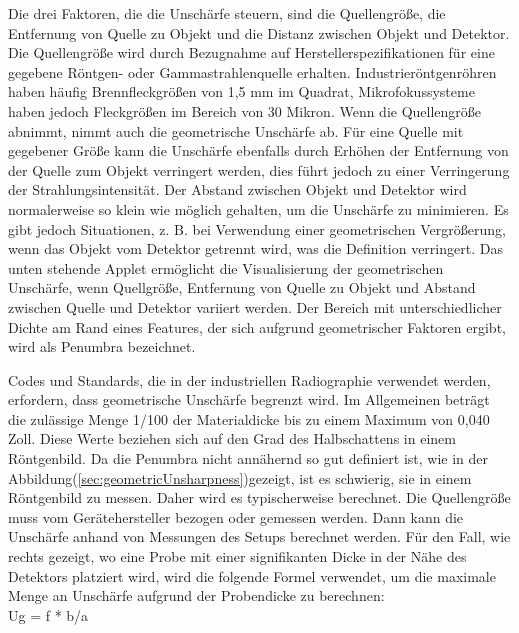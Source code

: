 Die drei Faktoren, die die Unschärfe steuern, sind die Quellengröße, die Entfernung von Quelle zu Objekt und die Distanz zwischen Objekt und Detektor. Die Quellengröße wird durch Bezugnahme auf Herstellerspezifikationen für eine gegebene Röntgen- oder Gammastrahlenquelle erhalten. Industrieröntgenröhren haben häufig Brennfleckgrößen von 1,5 mm im Quadrat, Mikrofokussysteme haben jedoch Fleckgrößen im Bereich von 30 Mikron. Wenn die Quellengröße abnimmt, nimmt auch die geometrische Unschärfe ab. Für eine Quelle mit gegebener Größe kann die Unschärfe ebenfalls durch Erhöhen der Entfernung von der Quelle zum Objekt verringert werden, dies führt jedoch zu einer Verringerung der Strahlungsintensität.
Der Abstand zwischen Objekt und Detektor wird normalerweise so klein wie möglich gehalten, um die Unschärfe zu minimieren. Es gibt jedoch Situationen, z. B. bei Verwendung einer geometrischen Vergrößerung, wenn das Objekt vom Detektor getrennt wird, was die Definition verringert. Das unten stehende Applet ermöglicht die Visualisierung der geometrischen Unschärfe, wenn Quellgröße, Entfernung von Quelle zu Objekt und Abstand zwischen Quelle und Detektor variiert werden. Der Bereich mit unterschiedlicher Dichte am Rand eines Features, der sich aufgrund geometrischer Faktoren ergibt, wird als Penumbra bezeichnet.

Codes und Standards, die in der industriellen Radiographie verwendet werden, erfordern, dass geometrische Unschärfe begrenzt wird. Im Allgemeinen beträgt die zulässige Menge 1/100 der Materialdicke bis zu einem Maximum von 0,040 Zoll. Diese Werte beziehen sich auf den Grad des Halbschattens in einem Röntgenbild.
Da die Penumbra nicht annähernd so gut definiert ist, wie in der Abbildung(\ref{sec:geometricUnsharpness})gezeigt, ist es schwierig, sie in einem Röntgenbild zu messen. Daher wird es typischerweise berechnet.
Die Quellengröße muss vom Gerätehersteller bezogen oder gemessen werden. Dann kann die Unschärfe anhand von Messungen des Setups berechnet werden.
Für den Fall, wie rechts gezeigt, wo eine Probe mit einer signifikanten Dicke in der Nähe des Detektors platziert wird, wird die folgende Formel verwendet, um die maximale Menge an Unschärfe aufgrund der Probendicke zu berechnen:\\

  Ug = f * b/a

